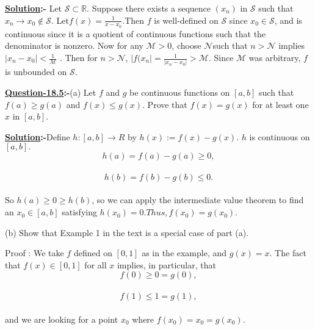 \documentclass[12pt]{article}
\begin{document}
\vspace*{1cm}
\textbf{\underline{Solution}:-} Let $\mathcal{S} \subset \mathbb{R}$. Suppose there exists a sequence $(x_{n})$ in $\mathcal{S}$ such that $x_{n} \rightarrow x_{0} \notin \mathcal{S}$.
Let$ f(x) = \frac{1}{x-x_{0}}$.Then $f$ is well-defined on $\mathcal{S}$ since $x_{0} \in \mathcal{S}$, and is continuous since
it is a quotient of continuous functions such that the denominator is nonzero. Now
for any $\mathcal{M} > 0$, choose $\mathcal{N} $such that $n > \mathcal{N}$ implies $|x_{n} - x_{0}| < \frac{1}{\mathcal{M}}$
. Then for $n > \mathcal{N}$,
$|f(x_{n}| =\frac{1}{|x_{n}-x_{0}|} > \mathcal{M}.$ Since $ \mathcal{M} $ was arbitrary, $f$ is unbounded on $\mathcal{S}$.\\

\vspace*{1cm}

\begin{mdframed}[style=MyFrame]
\textbf{\underline{Question-18.5}:-}(a)  Let $f$ and $g$ be continuous functions on $[a,b]$ such that $f(a)\geq g(a)$ and $f(x)\leq g(x)$. Prove that  $f(x) = g(x)$ for at least one $x$ in $[a,b]$.\\
\end{mdframed}
\vspace*{1cm}
\textbf{\underline{Solution}:-}Define $h : [a, b] \rightarrow R $ by $ h(x) := f(x) - g(x).$  $h$ is continuous on $[a, b].$ 
$$h(a) = f(a) − g(a) \geq 0,$$\\
$$h(b) = f(b) − g(b) \leq 0.$$\\
So $h(a) \geq 0 \geq h(b)$, so we can apply the intermediate value theorem to find an $x_{0} \in [a, b]$ satisfying
$h(x_{0}) = 0. Thus, f(x_{0}) = g(x_{0}).$\\

\vspace*{1cm}

\begin{mdframed}[style=MyFrame]
(b) Show that Example 1 in the text is a special case of part (a).\\
\end{mdframed}
\vspace*{1cm}
Proof : We take $f$ defined on $[0, 1]$ as in the example, and $g(x) = x.$ The fact that $f(x) \in [0, 1]$ for all $x$
implies, in particular, that
$$f(0) \geq 0 = g(0),$$\\
$$f(1) \leq 1 = g(1),$$\\
and we are looking for a point $x_{0} $ where $f(x_{0}) = x_{0} = g(x_{0}).$
\vspace{.5cm}
\end{document}
